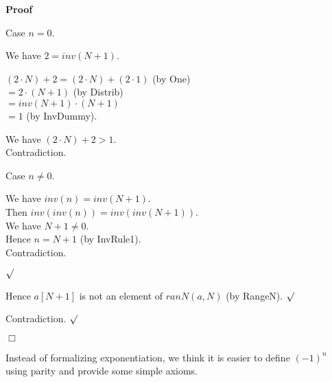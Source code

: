\documentclass{article}
\newenvironment{forthel}{\begin{leftbar}}{\end{leftbar}}
\newenvironment{proof}{\noindent\textbf{Proof\ }}{\hspace*{\fill}$\Box$\medskip}
\newenvironment{subproof}{\begin{list}{}{}
		\item[\text{Proof}]}{\hfill $\surd$ \end{list}}
\newenvironment{case}{\begin{list}{}{}
		\item[]}{\end{list}}
\newcommand{\dotequal}{=}
\begin{document}
\begin{forthel}
\begin{proof}
\begin{subproof}
\begin{subproof}
\begin{subproof}
					Case $n = 0$.
					\begin{case}
						We have $2 = inv(N + 1)$.
						
						$(2 \cdot N) + 2 \dotequal (2 \cdot N) + (2 \cdot 1)$ (by One)\\
						$\dotequal 2 \cdot (N + 1)$ (by Distrib)\\
						$\dotequal inv(N + 1) \cdot (N + 1)$\\
						$\dotequal 1$ (by InvDummy).
						
						We have $(2 \cdot N) + 2 > 1$.\\
						Contradiction.
					\end{case}
					Case $n \neq 0$.
					\begin{case}
						We have $inv(n) = inv(N + 1)$.\\
						Then $inv(inv(n)) = inv(inv(N + 1))$.\\
						We have $N + 1 \neq 0$.\\
						Hence $n = N + 1$ (by InvRule1).\\
						Contradiction.
					\end{case}
				\end{subproof}
				Hence $a[N + 1]$ is not an element of $ranN(a,N)$ (by RangeN).
			\end{subproof}
			Contradiction.
		\end{subproof}
	\end{proof}
\end{forthel}

\noindent Instead of formalizing exponentiation, we think it is easier to define $(-1)^{n}$ using parity and provide some simple axioms.
\end{document}
